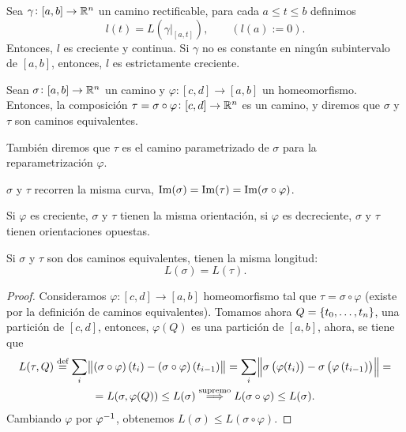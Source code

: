 \begin{prop}
    Sea $\gamma \colon [a,b] \to \mathbb{R}^n$ un camino rectificable, para cada $a \leq t \leq b$ definimos
    \[
        l(t) = L\left( \gamma\vert_{[a,t]} \right), \qquad (l(a) := 0).
    \]
    Entonces, $l$ es creciente y continua. Si $\gamma$ no es constante en ningún subintervalo de $[a,b]$,
    entonces, $l$ es estrictamente creciente.
\end{prop}

\begin{defi}
    Sean $\sigma \colon [a, b] \to \mathbb{R}^n$ un camino y $\varphi \colon [c, d] \to [a, b]$ un homeomorfismo. Entonces,
    la composición $\tau = \sigma \circ \varphi \colon [c,d] \to \mathbb{R}^n$ es un camino, y diremos que $\sigma$ y $\tau$
    son caminos equivalentes.

    Tambi\'en diremos que $\tau$ es el camino parametrizado de $\sigma$ para la reparametrización $\varphi$.
\end{defi}

\begin{obs*}
    $\sigma$ y $\tau$ recorren la misma curva, $\operatorname{Im}(\sigma) = \operatorname{Im}(\tau) = \operatorname{Im}(\sigma \circ \varphi)$.
\end{obs*}

\begin{obs}
    Si $\varphi$ es creciente, $\sigma$ y $\tau$ tienen la misma orientación, si $\varphi$ es decreciente,
    $\sigma$ y $\tau$ tienen orientaciones opuestas.
\end{obs}

\begin{prop}
    Si $\sigma$ y $\tau$ son dos caminos equivalentes, tienen la misma longitud:
    \[
        L(\sigma) = L(\tau).
    \]
\end{prop}

\begin{proof}
    Consideramos $\varphi \colon [c, d] \to [a, b]$ homeomorfismo tal que $\tau = \sigma \circ \varphi$
    (existe por la definición de caminos equivalentes). Tomamos ahora $Q = \left\{t_0, \dots, t_n\right\}$, una partición de $[c, d]$,
    entonces, $\varphi(Q)$ es una partición de $[a,b]$, ahora, se tiene que
    \begin{gather*}
        L(\tau, Q) \stackrel{\text{def}}{=} \sum_i \norm{(\sigma \circ \varphi) \left( t_i \right) - (\sigma \circ \varphi)\left( t_{i-1} \right)}
        = \sum_i \norm{\sigma\left( \varphi(t_i) \right) - \sigma\left( \varphi\left( t_{i-1} \right) \right)} = \\ =
        L(\sigma, \varphi(Q)) \leq L(\sigma) \stackrel{\text{supremo}}{\implies} L(\sigma \circ \varphi) \leq L(\sigma).
    \end{gather*}
    Cambiando $\varphi$ por $\varphi^{-1}$, obtenemos $L(\sigma) \leq L(\sigma \circ \varphi)$.
\end{proof}

